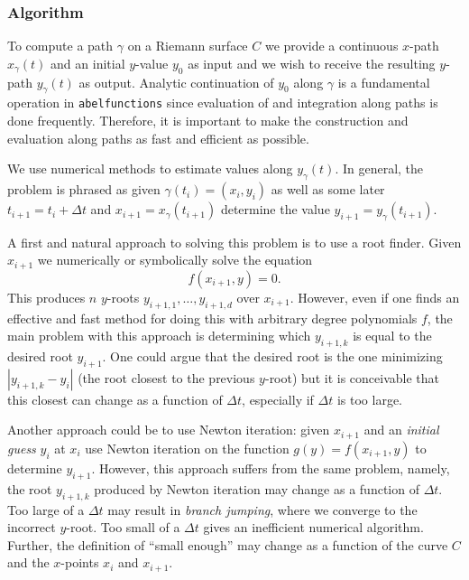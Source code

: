 %
\subsubsection*{Algorithm}
%

To compute a path $\gamma$ on a Riemann surface $C$ we provide a
continuous $x$-path $x_\gamma(t)$ and an initial $y$-value $y_0$ as
input and we wish to receive the resulting $y$-path $y_\gamma(t)$ as
output. Analytic continuation of $y_0$ along $\gamma$ is a fundamental
operation in {\tt abelfunctions} since evaluation of and integration
along paths is done frequently. Therefore, it is important to make the
construction and evaluation along paths as fast and efficient as
possible.

We use numerical methods to estimate values along $y_\gamma(t)$. In
general, the problem is phrased as given $\gamma(t_i) = (x_i,y_i)$ as
well as some later $t_{i+1} = t_i + \Delta t$ and $x_{i+1} =
x_\gamma(t_{i+1})$ determine the value $y_{i+1} = y_\gamma(t_{i+1})$.

A first and natural approach to solving this problem is to use a root
finder. Given $x_{i+1}$ we numerically or symbolically solve the
equation
\[
    f(x_{i+1},y) = 0.
\]
This produces $n$ $y$-roots $y_{i+1,1}, \ldots, y_{i+1,d}$ over
$x_{i+1}$. However, even if one finds an effective and fast method for
doing this with arbitrary degree polynomials $f$, the main problem with
this approach is determining which $y_{i+1,k}$ is equal to the desired
root $y_{i+1}$. One could argue that the desired root is the one
minimizing $|y_{i+1,k} - y_i|$ (the root closest to the previous
$y$-root) but it is conceivable that this closest can change as a
function of $\Delta t$, especially if $\Delta t$ is too large.

Another approach could be to use Newton iteration: given $x_{i+1}$ and
an {\it initial guess} $y_i$ at $x_i$ use Newton iteration on the
function $g(y) = f(x_{i+1}, y)$ to determine $y_{i+1}$. However, this
approach suffers from the same problem, namely, the root $y_{i+1,k}$
produced by Newton iteration may change as a function of $\Delta t$. Too
large of a $\Delta t$ may result in {\it branch jumping}, where we
converge to the incorrect $y$-root. Too small of a $\Delta t$ gives an
inefficient numerical algorithm. Further, the definition of ``small
enough'' may change as a function of the curve $C$ and the $x$-points
$x_{i}$ and $x_{i+1}$.


